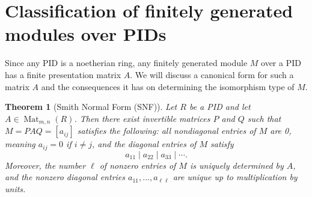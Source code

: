 \documentclass[12pt]{report}
\newtheorem{theorem}{Theorem}[chapter]
\numberwithin{equation}{section}
\numberwithin{theorem}{chapter}
\theoremstyle{definition}
\newtheorem{example}[theorem]{Example}
\newtheorem*{basic properties}{Basic Properties}
\newtheorem*{Important Remark}{Important Remark}
\DeclareMathOperator{\M}{Mat}
\begin{document}
\section{Classification of finitely generated modules over PIDs}

Since any PID is a noetherian ring, any finitely generated module $M$ over a PID has a finite presentation matrix $A$. We will discuss a canonical form for such a matrix $A$ and the consequences it has on determining the isomorphism type of $M$.

 
\begin{theorem}[Smith Normal Form (SNF)]\label{Smith Normal Form}
 Let $R$ be a PID and let $A \in \M_{m,n}(R)$. Then there exist invertible matrices $P$ and $Q$ such that $M = PAQ = [a_{ij}]$ satisfies the following: all nondiagonal entries of $M$ are 0, meaning $a_{ij} = 0$ if $i \neq j$, and the diagonal entries of $M$ satisfy 
$$a_{11} \mid a_{22} \mid a_{33} \mid \cdots.$$ 
Moreover, the number $\ell$ of nonzero entries of $M$ is uniquely determined by $A$, and the nonzero diagonal entries $a_{11},\ldots, a_{\ell \ell}$ are unique up to multiplication by units.
\end{theorem}
 
% 
%
%
\end{document}
